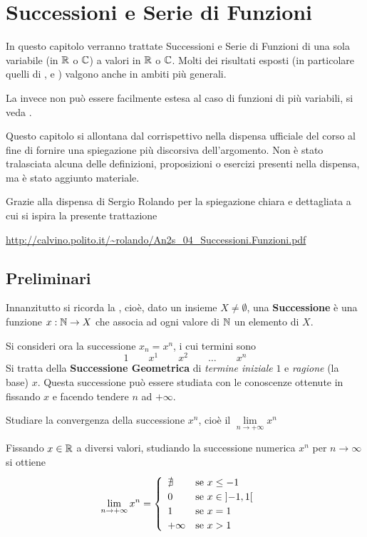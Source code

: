 \chapter{Successioni e Serie di Funzioni}
In questo capitolo verranno trattate Successioni e Serie di Funzioni di una sola variabile (in $\mathbb{R}$ o $\mathbb{C}$) a valori in $\mathbb{R}$ o $\mathbb{C}$. Molti dei risultati esposti (in particolare quelli di ,  e ) valgono anche in ambiti più generali.

La  invece non può essere facilmente estesa al caso di funzioni di più variabili, si veda .

\vspace*{\baselineskip}
Questo capitolo si allontana dal corrispettivo nella dispensa ufficiale del corso al fine di fornire una spiegazione più discorsiva dell'argomento. Non è stato tralasciata alcuna delle definizioni, proposizioni o esercizi presenti nella dispensa, ma è stato aggiunto materiale.

Grazie alla dispensa di Sergio Rolando per la spiegazione chiara e dettagliata a cui si ispira la presente trattazione
\begin{center}
	\url{http://calvino.polito.it/~rolando/An2s_04_Successioni.Funzioni.pdf}
\end{center}

\section{Preliminari}
Innanzitutto si ricorda la , cioè, dato un insieme $X \neq \emptyset$, una \textbf{Successione} è una funzione $x: \mathbb{N} \to X$ che associa ad ogni valore di $\mathbb{N}$ un elemento di $X$.

Si consideri ora la successione $x_n = x^n$, i cui termini sono
\[1 \qquad x^1 \qquad x^2  \qquad \dots \qquad x^n\]
Si tratta della \textbf{Successione Geometrica} di \textit{termine iniziale} $1$ e \textit{ragione} (la base) $x$. Questa successione può essere studiata con le conoscenze ottenute in  fissando $x$ e facendo tendere $n$ ad $+\infty$.
\begin{example}
	\label{ex:conv_succ_xn}
	Studiare la convergenza della successione $x^n$, cioè il $\lim\limits_{n \to +\infty} x^n$
	\begin{solution}
		Fissando $x \in \mathbb{R}$ a diversi valori, studiando la successione numerica $x^n$ per $n \to \infty$ si ottiene
		\[
			\lim\limits_{n \to +\infty} x^n =
			\begin{cases}
				\begin{array}{ll}
					\nexists & \text{se } x \leq -1\\
					0 & \text{se } x \in \left]-1,1\right[\\
					1 & \text{se } x = 1\\
					+\infty & \text{se } x > 1
				\end{array}
			\end{cases}
		\]
	\end{solution}
\end{example}

